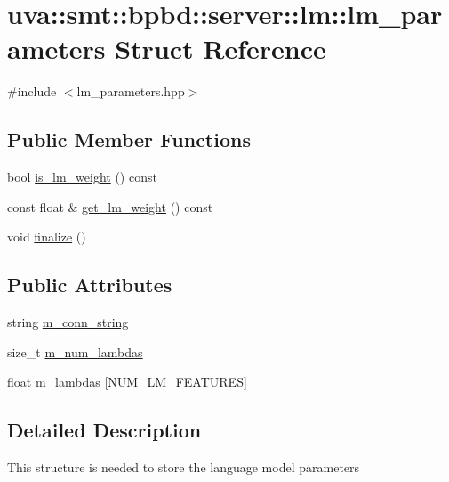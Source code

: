 \hypertarget{structuva_1_1smt_1_1bpbd_1_1server_1_1lm_1_1lm__parameters}{}\section{uva\+:\+:smt\+:\+:bpbd\+:\+:server\+:\+:lm\+:\+:lm\+\_\+parameters Struct Reference}
\label{structuva_1_1smt_1_1bpbd_1_1server_1_1lm_1_1lm__parameters}


{\ttfamily \#include $<$lm\+\_\+parameters.\+hpp$>$}

\subsection*{Public Member Functions}
\begin{DoxyCompactItemize}
\item 
bool \hyperlink{structuva_1_1smt_1_1bpbd_1_1server_1_1lm_1_1lm__parameters_aefea848bb69a35e2dcb5dbcffee7f445}{is\+\_\+lm\+\_\+weight} () const 
\item 
const float \& \hyperlink{structuva_1_1smt_1_1bpbd_1_1server_1_1lm_1_1lm__parameters_a68253fe0557abc9a4baab57b6b7c81e5}{get\+\_\+lm\+\_\+weight} () const 
\item 
void \hyperlink{structuva_1_1smt_1_1bpbd_1_1server_1_1lm_1_1lm__parameters_a37a55e946e49d8a7eace32841d8bdee4}{finalize} ()
\end{DoxyCompactItemize}
\subsection*{Public Attributes}
\begin{DoxyCompactItemize}
\item 
string \hyperlink{structuva_1_1smt_1_1bpbd_1_1server_1_1lm_1_1lm__parameters_afd0d3b2be8643b3eac973253a5df7fcb}{m\+\_\+conn\+\_\+string}
\item 
size\+\_\+t \hyperlink{structuva_1_1smt_1_1bpbd_1_1server_1_1lm_1_1lm__parameters_ab44cd993fed6f7b68fe190855dcc2eb4}{m\+\_\+num\+\_\+lambdas}
\item 
float \hyperlink{structuva_1_1smt_1_1bpbd_1_1server_1_1lm_1_1lm__parameters_a0e02b834a11c3473751f9bb902d69993}{m\+\_\+lambdas} \mbox{[}N\+U\+M\+\_\+\+L\+M\+\_\+\+F\+E\+A\+T\+U\+R\+E\+S\mbox{]}
\end{DoxyCompactItemize}


\subsection{Detailed Description}
This structure is needed to store the language model parameters 

